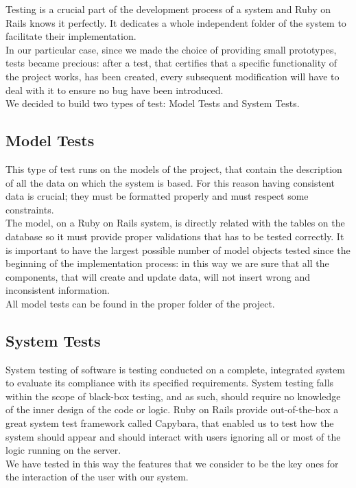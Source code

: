 Testing is a crucial part of the development process of a system and Ruby on Rails knows it perfectly. It dedicates a whole independent folder of the system to facilitate their implementation. \\
In our particular case, since we made the choice of providing small prototypes, tests became precious: after a test, that certifies that a specific functionality of the project works, has been created, every subsequent modification will have to deal with it to ensure no bug have been introduced. \\
We decided to build two types of test: Model Tests and System Tests.

\subsection{Model Tests}
This type of test runs on the models of the project, that contain the description of all the data on which the system is based. For this reason having consistent data is crucial; they must be formatted properly and must respect some constraints. \\
The model, on a Ruby on Rails system, is directly related with the tables on the database so it must provide proper validations that has to be tested correctly. It is important to have the largest possible number of model objects tested since the beginning of the implementation process: in this way we are sure that all the components, that will create and update data, will not insert wrong and inconsistent information. \\
All model tests can be found in the proper folder of the project. 

\subsection{System Tests}
System testing of software is testing conducted on a complete, integrated system to evaluate its compliance with its specified requirements. System testing falls within the scope of black-box testing, and as such, should require no knowledge of the inner design of the code or logic. Ruby on Rails provide out-of-the-box a great system test framework called Capybara, that enabled us to test how the system should appear and should interact with users ignoring all or most of the logic running on the server. \\
We have tested in this way the features that we consider to be the key ones for the interaction of the user with our system.

